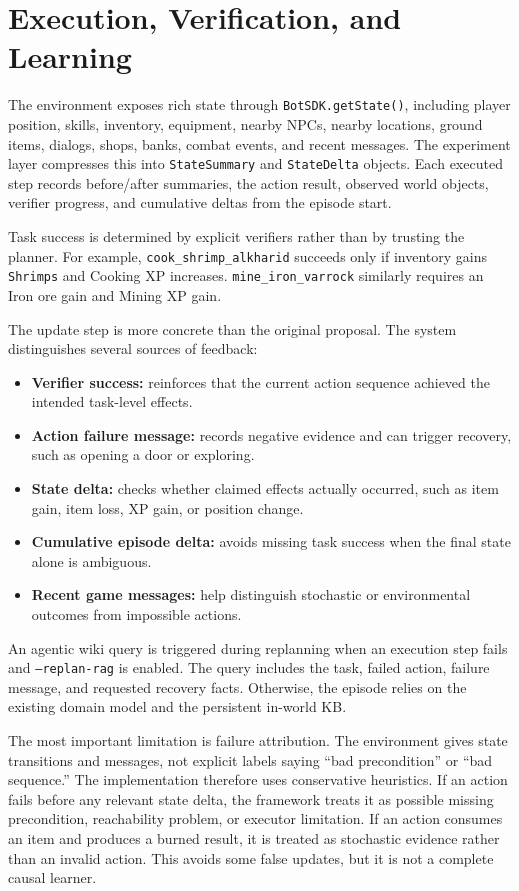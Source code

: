 \documentclass[10pt,twocolumn,letterpaper]{article}
\begin{document}
\section{Execution, Verification, and Learning}

The environment exposes rich state through \texttt{BotSDK.getState()}, including player position, skills, inventory, equipment, nearby NPCs, nearby locations, ground items, dialogs, shops, banks, combat events, and recent messages. The experiment layer compresses this into \texttt{StateSummary} and \texttt{StateDelta} objects. Each executed step records before/after summaries, the action result, observed world objects, verifier progress, and cumulative deltas from the episode start.

Task success is determined by explicit verifiers rather than by trusting the planner. For example, \texttt{cook\_shrimp\_alkharid} succeeds only if inventory gains \texttt{Shrimps} and Cooking XP increases. \texttt{mine\_iron\_varrock} similarly requires an Iron ore gain and Mining XP gain.

The update step is more concrete than the original proposal. The system distinguishes several sources of feedback:

\begin{itemize}
    \item \textbf{Verifier success:} reinforces that the current action sequence achieved the intended task-level effects.
    \item \textbf{Action failure message:} records negative evidence and can trigger recovery, such as opening a door or exploring.
    \item \textbf{State delta:} checks whether claimed effects actually occurred, such as item gain, item loss, XP gain, or position change.
    \item \textbf{Cumulative episode delta:} avoids missing task success when the final state alone is ambiguous.
    \item \textbf{Recent game messages:} help distinguish stochastic or environmental outcomes from impossible actions.
\end{itemize}

An agentic wiki query is triggered during replanning when an execution step fails and \texttt{--replan-rag} is enabled. The query includes the task, failed action, failure message, and requested recovery facts. Otherwise, the episode relies on the existing domain model and the persistent in-world KB.

The most important limitation is failure attribution. The environment gives state transitions and messages, not explicit labels saying ``bad precondition'' or ``bad sequence.'' The implementation therefore uses conservative heuristics. If an action fails before any relevant state delta, the framework treats it as possible missing precondition, reachability problem, or executor limitation. If an action consumes an item and produces a burned result, it is treated as stochastic evidence rather than an invalid action. This avoids some false updates, but it is not a complete causal learner.
\end{document}
